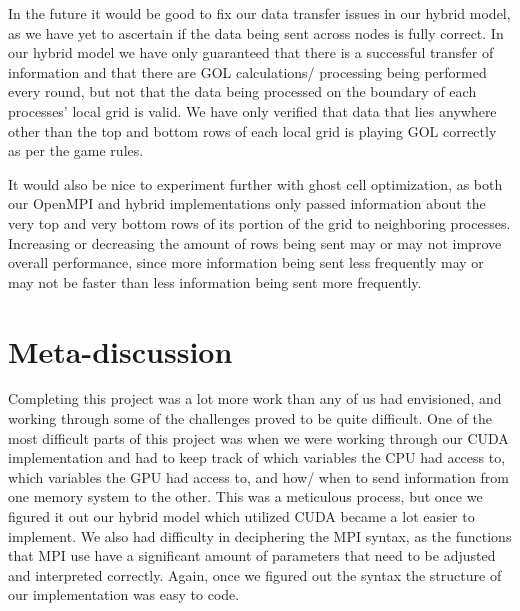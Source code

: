 \documentclass[11pt,twocolumn]{article}
\begin{document}
In the future it would be good to fix our data transfer issues in our hybrid model, as we have yet to ascertain if the data being sent across nodes is fully correct. In our hybrid model we have only guaranteed that there is a successful transfer of information and that there are GOL calculations/ processing being performed every round, but not that the data being processed on the boundary of each processes' local grid is valid. We have only verified that data that lies anywhere other than the top and bottom rows of each local grid is playing GOL correctly as per the game rules.

It would also be nice to experiment further with ghost cell optimization, as both our OpenMPI and hybrid implementations only passed information about the very top and very bottom rows of its portion of the grid to neighboring processes. Increasing or decreasing the amount of rows being sent may or may not improve overall performance, since more information being sent less frequently may or may not be faster than less information being sent more frequently. 

\section{Meta-discussion}\label{meta} 
Completing this project was a lot more work than any of us had envisioned, and working through some of the challenges proved to be quite difficult. One of the most difficult parts of this project was when we were working through our CUDA implementation and had to keep track of which variables the CPU had access to, which variables the GPU had access to, and how/ when to send information from one memory system to the other. This was a meticulous process, but once we figured it out our hybrid model which utilized CUDA became a lot easier to implement. We also had difficulty in deciphering the MPI syntax, as the functions that MPI use have a significant amount of parameters that need to be adjusted and interpreted correctly. Again, once we figured out the syntax the structure of our implementation was easy to code.
\end{document}
